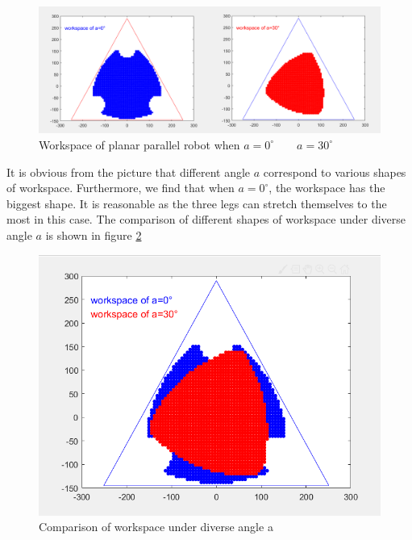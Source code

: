 \documentclass{article}
\begin{document}
\begin{figure}[htbp] 
\begin{center}
\includegraphics[width=\textwidth]{images/parallel_workspace2}
\caption{Workspace of planar parallel robot when $a=0^{\circ}\qquad a=30^{\circ}$}
\label{fig:parallel_workspace2}
\end{center}
\end{figure}

It is obvious from the picture that different angle $a$ correspond to various shapes of workspace. Furthermore, we find that when $a=0^{\circ}$, the workspace has the biggest shape. It is reasonable as the three legs can stretch themselves to the most in this case. The comparison of different shapes of workspace under diverse angle $a$ is shown in figure \ref{fig:parallel_workspace2}

\begin{figure}[htbp] 
\begin{center}
\includegraphics[width=\textwidth]{images/parallel_workspace}
\caption{Comparison of workspace under diverse angle a}
\label{fig:parallel_workspace2}
\end{center}
\end{figure}
\end{document}
